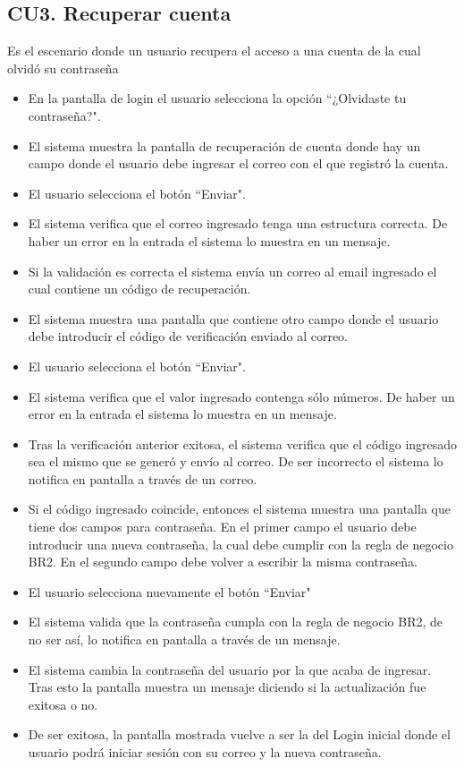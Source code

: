 \newpage
\subsection{CU3. Recuperar cuenta}  \par
Es el escenario donde un usuario recupera el acceso a una cuenta de la cual olvidó su contraseña
\begin{itemize}
	\item En la pantalla de login el usuario selecciona la opción ``¿Olvidaste tu contraseña?".
	\item El sistema muestra la pantalla de recuperación de cuenta donde hay un campo donde el usuario debe ingresar el correo con el que registró la cuenta.
	\item El usuario selecciona el botón ``Enviar".
	\item El sistema verifica que el correo ingresado tenga una estructura correcta. De haber un error en la entrada el sistema lo muestra en un mensaje.
	\item Si la validación es correcta el sistema envía un correo al email ingresado el cual contiene un código de recuperación.
	\item El sistema muestra una pantalla que contiene otro campo donde el usuario debe introducir el código de verificación enviado al correo.
	\item El usuario selecciona el botón ``Enviar".
	\item El sistema verifica que el valor ingresado contenga sólo números. De haber un error en la entrada el sistema lo muestra en un mensaje.
	\item Tras la verificación anterior exitosa, el sistema verifica que el código ingresado sea el mismo que se generó y envío al correo. De ser incorrecto el sistema lo notifica en pantalla a través de un correo.
	\item Si el código ingresado coincide, entonces el sistema muestra una pantalla que tiene dos campos para contraseña. En el primer campo el usuario debe introducir una nueva contraseña, la cual debe cumplir con la regla de negocio BR2. En el segundo campo debe volver a escribir la misma contraseña.
	\item El usuario selecciona nuevamente el botón ``Enviar"
	\item El sistema valida que la contraseña cumpla con la regla de negocio BR2, de no ser así, lo notifica en pantalla a través de un mensaje.
	\item El sistema cambia la contraseña del usuario por la que acaba de ingresar. Tras esto la pantalla muestra un mensaje diciendo si la actualización fue exitosa o no.
	\item De ser exitosa, la pantalla mostrada vuelve a ser la del Login inicial donde el usuario podrá iniciar sesión con su correo y la nueva contraseña.
\end{itemize}

